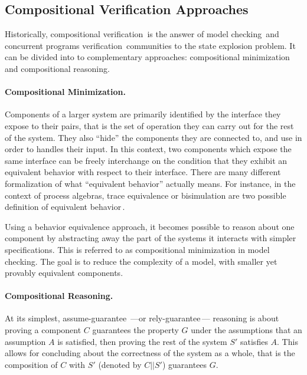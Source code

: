 \subsection{Compositional Verification Approaches}
\label{subsec:sota:compverif}

Historically, compositional verification\,\cite{peng1998survey} is the answer of
model checking\,\cite{mcmillan1989compositional} and concurrent programs
verification\,\cite{jones1983tentative} communities to the state explosion
problem.
%
It can be divided into to complementary approaches: compositional minimization
and compositional reasoning.

\paragraph{Compositional Minimization.}
%
Components of a larger system are primarily identified by the interface they
expose to their pairs, that is the set of operation they can carry out for the
rest of the system.
%
They also ``hide'' the components they are connected to, and use in order to
handles their input.
%
In this context, two components which expose the same interface can be freely
interchange on the condition that they exhibit an equivalent behavior with
respect to their interface.
%
There are many different formalization of what ``equivalent behavior'' actually
means.
%
For instance, in the context of process algebras, trace equivalence or
bisimulation are two possible definition of equivalent
behavior\,\cite{fokkink2013pa}.

Using a behavior equivalence approach, it becomes possible to reason about one
component by abstracting away the part of the systems it interacts with simpler
specifications.
%
This is referred to as compositional minimization in model checking.
%
The goal is to reduce the complexity of a model, with smaller yet provably
equivalent components.

\paragraph{Compositional Reasoning.}
%
At its simplest, assume-guarantee\,\cite{pnueli1985ag} ---or
rely-guarantee\,\cite{jones1983tentative}--- reasoning is about proving a
component \( C \) guarantees the property \( G \) under the assumptions that an
assumption \( A \) is satisfied, then proving the rest of the system \( S' \)
satisfies \( A \).
%
This allows for concluding about the correctness of the system as a whole, that
is the composition of \( C \) with \( S' \) (denoted by \( C || S' \))
guarantees \( G \).

